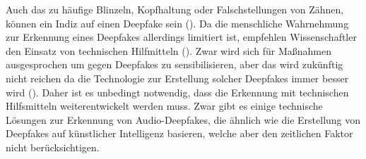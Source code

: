 Auch das zu häufige Blinzeln, Kopfhaltung oder Falschstellungen von Zähnen, können ein Indiz auf einen Deepfake sein (\cite{Shahzad2022}).
Da die menschliche Wahrnehmung zur Erkennung eines Deepfakes allerdings limitiert ist, empfehlen Wissenschaftler den Einsatz von technischen Hilfmitteln (\cite{Mueller2022}).
Zwar wird sich für Maßnahmen ausgesprochen um gegen Deepfakes zu sensibilisieren, aber das wird zukünftig nicht reichen da die Technologie zur Erstellung solcher Deepfakes immer besser wird (\cite{Amezaga2022}).
Daher ist es unbedingt notwendig, dass die Erkennung mit technischen Hilfsmitteln weiterentwickelt werden muss.
Zwar gibt es einige technische Lösungen zur Erkennung von Audio-Deepfakes, die ähnlich wie die Erstellung von Deepfakes auf künstlicher Intelligenz basieren, welche aber den zeitlichen Faktor nicht berücksichtigen.